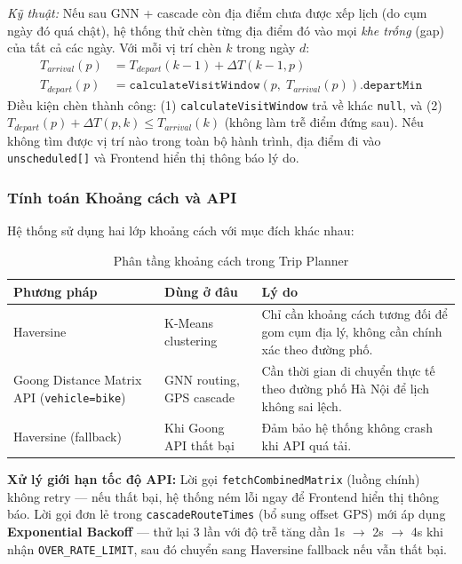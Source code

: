 \documentclass[12pt,a4paper]{article}
\begin{document}
\textit{Kỹ thuật:} Nếu sau GNN + cascade còn địa điểm chưa được xếp lịch (do
cụm ngày đó quá chật), hệ thống thử chèn từng địa điểm đó vào mọi \textit{khe
trống} (gap) của tất cả các ngày. Với mỗi vị trí chèn $k$ trong ngày $d$:
\begin{align}
  T_{arrival}(p) &= T_{depart}(k-1) + \Delta T(k-1, p) \\
  T_{depart}(p)  &= \texttt{calculateVisitWindow}(p,\; T_{arrival}(p))\texttt{.departMin}
\end{align}
Điều kiện chèn thành công: (1) \texttt{calculateVisitWindow} trả về khác
\texttt{null}, và (2) $T_{depart}(p) + \Delta T(p, k) \le T_{arrival}(k)$
(không làm trễ điểm đứng sau). Nếu không tìm được vị trí nào trong toàn bộ
hành trình, địa điểm đi vào \texttt{unscheduled[]} và Frontend hiển thị thông
báo lý do.

\subsubsection{Tính toán Khoảng cách và API}

Hệ thống sử dụng hai lớp khoảng cách với mục đích khác nhau:

\begin{table}[H]
\centering
\renewcommand{\arraystretch}{1.3}
\begin{tabular}{@{} p{} p{} p{} @{}}
\toprule
\textbf{Phương pháp} & \textbf{Dùng ở đâu} & \textbf{Lý do} \\
\midrule
Haversine & K-Means clustering & Chỉ cần khoảng cách tương đối để gom cụm địa lý, không cần chính xác theo đường phố. \\
\addlinespace
Goong Distance Matrix API (\texttt{vehicle=bike}) & GNN routing, GPS cascade & Cần thời gian di chuyển thực tế theo đường phố Hà Nội để lịch không sai lệch. \\
\addlinespace
Haversine (fallback) & Khi Goong API thất bại & Đảm bảo hệ thống không crash khi API quá tải. \\
\bottomrule
\end{tabular}
\caption{Phân tầng khoảng cách trong Trip Planner}
\end{table}

\textbf{Xử lý giới hạn tốc độ API:} Lời gọi \texttt{fetchCombinedMatrix} (luồng
chính) không retry --- nếu thất bại, hệ thống ném lỗi ngay để Frontend hiển thị
thông báo. Lời gọi đơn lẻ trong \texttt{cascadeRouteTimes} (bổ sung offset GPS)
mới áp dụng \textbf{Exponential Backoff} --- thử lại 3 lần với độ trễ tăng dần
1s $\to$ 2s $\to$ 4s khi nhận \texttt{OVER\_RATE\_LIMIT}, sau đó chuyển sang
Haversine fallback nếu vẫn thất bại.
\end{document}
